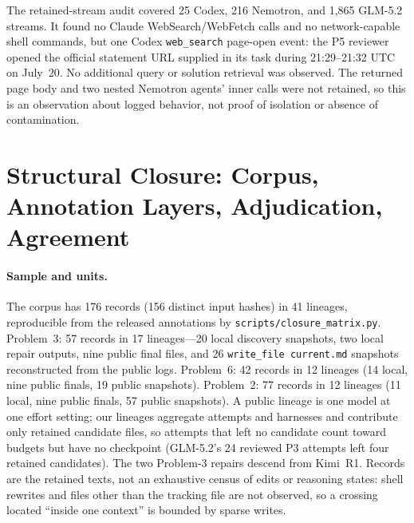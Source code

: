 The retained-stream audit covered 25 Codex, 216 Nemotron, and 1,865 GLM-5.2 streams. It found no Claude WebSearch/WebFetch calls and no network-capable shell commands, but one Codex \texttt{web\_search} page-open event: the P5 reviewer opened the official statement URL supplied in its task during 21:29--21:32 UTC on July~20. No additional query or solution retrieval was observed. The returned page body and two nested Nemotron agents' inner calls were not retained, so this is an observation about logged behavior, not proof of isolation or absence of contamination.

\section{Structural Closure: Corpus, Annotation Layers, Adjudication, Agreement}
\label{app:closure}

\paragraph{Sample and units.} The corpus has 176 records (156 distinct input hashes) in 41 lineages, reproducible from the released annotations by \texttt{scripts/\allowbreak closure\_matrix.py}. Problem~3: 57 records in 17 lineages---20 local discovery snapshots, two local repair outputs, nine public final files, and 26 \texttt{write\_file current.md} snapshots reconstructed from the public logs. Problem~6: 42 records in 12 lineages (14 local, nine public finals, 19 public snapshots). Problem~2: 77 records in 12 lineages (11 local, nine public finals, 57 public snapshots). A public lineage is one model at one effort setting; our lineages aggregate attempts and harnesses and contribute only retained candidate files, so attempts that left no candidate count toward budgets but have no checkpoint (GLM-5.2's 24 reviewed P3 attempts left four retained candidates). The two Problem-3 repairs descend from Kimi~R1. Records are the retained texts, not an exhaustive census of edits or reasoning states: shell rewrites and files other than the tracking file are not observed, so a crossing located ``inside one context'' is bounded by sparse writes.

\begin{table}[htbp]
  \caption{Valid-layer $S$ of the last checkpoint\,/\,grade. Public: nine runs of one thin harness \citep{deedy2026imo}, grade = verifier first-pass grade (``$a{\to}b$'': repaired later); ours: gate outcome. xhigh/Pro/max/default/ultra: GPT-5.6-Sol effort settings; R1/R2: our Kimi runs; $^{*}$ $S{=}2$ with grade $<5$; $^{\ddagger}$ wrong answer; $^{\mathrm{r}}$ non-synthetic route (rubric N/A).}
  \label{tab:matrix}
  \centering\scriptsize\renewcommand{\arraystretch}{0.92}
\MATRIXBODY
\end{table}

